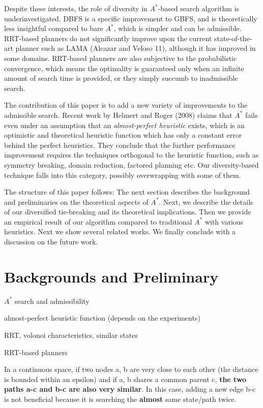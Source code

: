 Despite these interests, the role of diversity in \(A^*\)-based search
algorithm is underinvestigated.
DBFS is a specific improvement to GBFS, and is theoretically less insightful compared
to bare \(A^*\), which is simpler and can be admissible.
RRT-based planners do not significantly improve upon the current
state-of-the-art planner such as LAMA (Alcazar and Veloso 11), although it
has improved in some domains. RRT-based planners are also subjective to
the probabilistic convergence, which means the optimality is guaranteed
only when an infinite amount of search time is provided, or they simply succumb to
inadmissible search.


The contribution of this paper is to add a new variety of improvements to the admissible search.
Recent work by Helmert and Roger (2008) claims that \(A^*\) fails even under an
assumption that an \emph{almost-perfect heuristic} exists, which is an
optimistic and theoretical heuristic function which has only a constant error
behind the perfect heuristics.
They conclude that the further performance improvement requires the
techniques orthogonal to the heuristic function, such as symmetry breaking,
domain reduction, factored planning etc.
Our diversity-based technique falls into this category, possibly
overwrapping with some of them.

The structure of this paper follows: The next section describes the background and
preliminaries on the theoretical aspects of \(A^*\). Next, we describe the
details of our diversified tie-breaking and its theoretical implications.
Then we provide an empirical result of our algorithm compared to
traditional \(A^*\) with various heuristics. Next we show several related
works. We finally conclude with a discussion on the future work.

\section{Backgrounds and Preliminary}
\label{sec-1}

\(A^*\) search and admissibility

almost-perfect heuristic function (depends on the experiments)

RRT, volonoi characteristics, similar states

RRT-based planners

In a continuous space,
if two nodes a, b are very close to each other (the distance is bounded within an epsilon)
and if a, b shares a common parent c,
\textbf{the two paths a-c and b-c are also very similar}.
In this case, adding a new edge b-c is
not beneficial because it is searching the \textbf{almost} same state/path twice.

